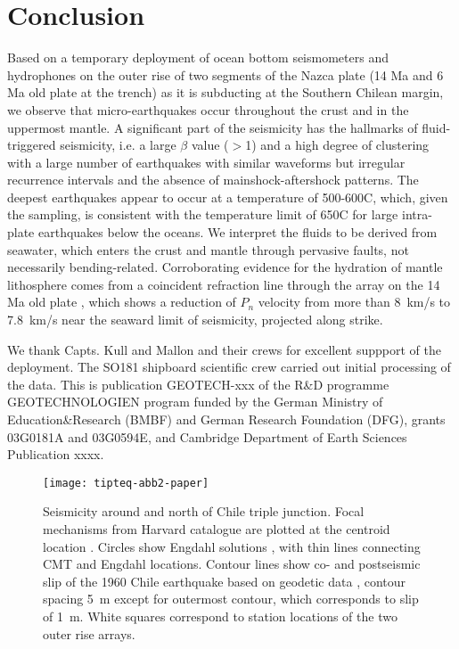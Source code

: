 \documentclass[reviewcopy]{elsarticle}
\renewcommand{\includegraphics}[2][]{\fbox{#2}}
\begin{document}
\section{Conclusion}

Based on a temporary deployment of ocean bottom seismometers and
hydrophones on the outer rise of two segments of the Nazca plate  (14 Ma and 6 Ma old plate at the trench) as
it is subducting at the Southern Chilean margin, we observe that
micro-earthquakes occur throughout the crust and in the uppermost
mantle.  A significant part of
the seismicity has the hallmarks of fluid-triggered seismicity,
i.e. a large $\beta$ value ($>$1) and a high degree of clustering with a
large number of earthquakes with similar waveforms but irregular
recurrence intervals and the absence of mainshock-aftershock
patterns. The deepest earthquakes appear to occur at a temperature of
500-600\dg C, which, given the sampling, is consistent with the
temperature limit of 650\dg C for large intra-plate earthquakes below
the oceans.
We interpret the fluids to be derived from seawater, which enters the
crust and mantle through pervasive faults, not necessarily
bending-related.  Corroborating evidence for the hydration of mantle lithosphere
comes from a coincident refraction line through the array on the 14 Ma
old plate \citep{contreras-reyes07},
which shows a reduction of $P_n$ velocity from more than 8~km/s to 7.8~km/s
near the seaward limit of seismicity, projected along strike.




\ack
We thank
Capts. Kull and Mallon and their crews for excellent suppport of the deployment.
The SO181 shipboard scientific crew carried out initial processing of
the data.
This is publication GEOTECH-xxx of the R\&D programme GEOTECHNOLOGIEN program funded by
the German Ministry of Education\&Research (BMBF) and German Research
Foundation (DFG), grants 03G0181A and 03G0594E,  and Cambridge Department of Earth Sciences Publication xxxx.





\begin{figure}
\centering
\texttt{[image: tipteq-abb2-paper]}
\caption{Seismicity around and north of Chile triple junction. Focal
  mechanisms from Harvard catalogue are plotted at the centroid location \citep{dziewonski81a}. Circles show Engdahl
  solutions \citep{engdahl98}, with thin lines connecting CMT and Engdahl locations.  Contour lines show co- and
  postseismic slip of the 1960 Chile earthquake based on geodetic data
  \citep{barrientos90}, contour spacing 5~m except for outermost
  contour, which corresponds to slip of 1~m.  White squares correspond
to station locations of the two outer rise arrays.}
\label{fig:overview-map}

\end{figure}
\end{document}
